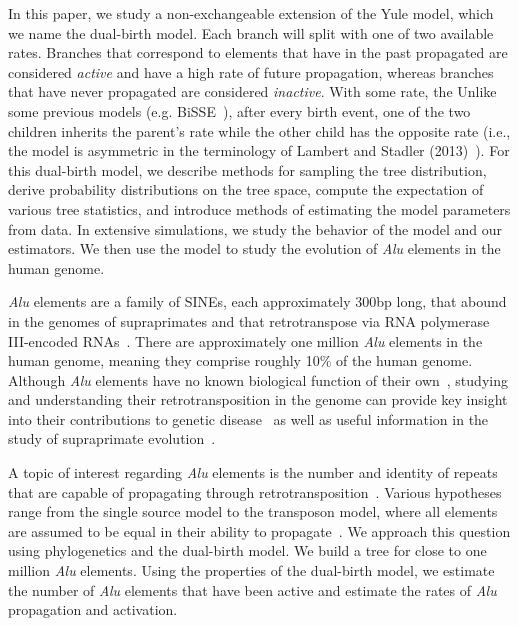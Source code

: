 In this paper, we study a non-exchangeable extension of the Yule model, which we name the dual-birth model. Each branch will split with one of two available rates. Branches that correspond to elements that have in the past propagated are considered \textit{active} and have a high rate of future propagation, whereas  branches that have never propagated are considered \textit{inactive}. With some rate, the Unlike some previous models (e.g. BiSSE~\cite{Maddison2007}), after every birth event, one of the two children inherits the parent's rate while the other child has the opposite rate (i.e., the model is asymmetric in the terminology of Lambert and Stadler (2013)~\cite{Lambert2013}). For this dual-birth  model, we describe methods for sampling the tree distribution, derive probability distributions on the tree space, compute the expectation of various tree statistics, and introduce methods of estimating the model parameters from data. In extensive simulations, we study the behavior of the model and our estimators. We then use the model to study the evolution of \textit{Alu} elements in the human genome.

\textit{Alu} elements are a family of \glspl{SINE}, each approximately 300bp long, that abound in the genomes of supraprimates and that retrotranspose via \gls{RNA} polymerase III-encoded \glspl{RNA}~\cite{Dewannieux2003}. There are approximately one million \textit{Alu} elements in the human genome, meaning they comprise roughly 10\% of the human genome. Although \textit{Alu} elements have no known biological function of their own~\cite{Schmid2003}, studying and understanding their retrotransposition in the genome can provide key insight into their contributions to genetic disease~\cite{Deininger1999} as well as useful information in the study of supraprimate evolution~\cite{Stoneking1997,Singer2003,Watkins2003}.

A topic of interest regarding \textit{Alu} elements is the number and identity of repeats that are capable of propagating through retrotransposition~\cite{Cordaux2004,Liu2009,Konkel2015}. Various hypotheses range from the single source model to the transposon model, where all elements are assumed to be equal in their ability to propagate~\cite{Cordaux2004}. We approach this question using phylogenetics and the dual-birth model. We build a tree for close to one million \textit{Alu} elements. Using the properties of the dual-birth model, we estimate the number of \textit{Alu} elements that have been active and estimate the rates of \textit{Alu} propagation and activation.

